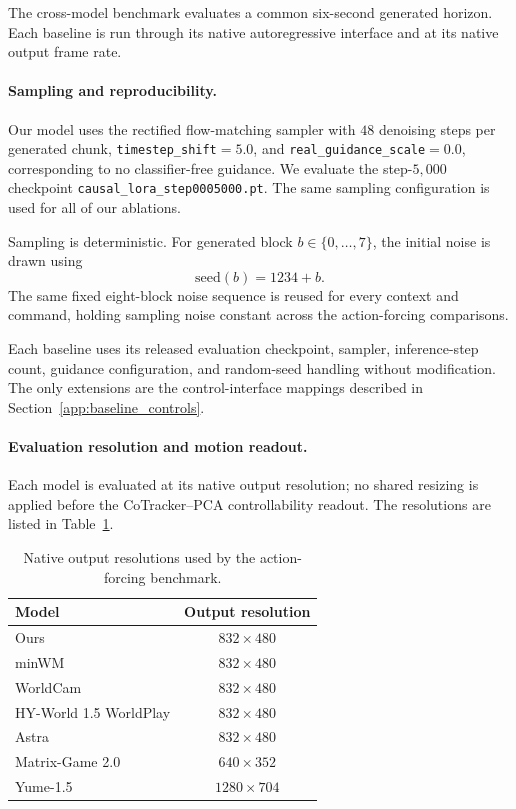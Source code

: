 The cross-model benchmark evaluates a common six-second generated horizon.
Each baseline is run through its native autoregressive interface and at its
native output frame rate.

\paragraph{Sampling and reproducibility.}
Our model uses the rectified flow-matching sampler with $48$ denoising steps
per generated chunk, \texttt{timestep\_shift}$=5.0$, and
\texttt{real\_guidance\_scale}$=0.0$, corresponding to no classifier-free
guidance. We evaluate the step-$5{,}000$ checkpoint
\texttt{causal\_lora\_step0005000.pt}. The same sampling configuration is used
for all of our ablations.

Sampling is deterministic. For generated block
$b\in\{0,\ldots,7\}$, the initial noise is drawn using
\[
\mathrm{seed}(b)=1234+b.
\]
The same fixed eight-block noise sequence is reused for every context and
command, holding sampling noise constant across the action-forcing
comparisons.

Each baseline uses its released evaluation checkpoint, sampler, inference-step
count, guidance configuration, and random-seed handling without modification.
The only extensions are the control-interface mappings described in
Section~\ref{app:baseline_controls}.

\paragraph{Evaluation resolution and motion readout.}
Each model is evaluated at its native output resolution; no shared resizing is
applied before the CoTracker--PCA controllability readout. The resolutions are
listed in Table~\ref{tab:action_forcing_resolutions}.

\begin{table}[t]
\centering
{
\small
\begin{tabular}{lc}
\toprule
Model & Output resolution \\
\midrule
Ours                   & $832\times480$  \\
minWM                  & $832\times480$  \\
WorldCam               & $832\times480$  \\
HY-World 1.5 WorldPlay & $832\times480$  \\
Astra                  & $832\times480$  \\
Matrix-Game 2.0        & $640\times352$  \\
Yume-1.5               & $1280\times704$ \\
\bottomrule
\end{tabular}
}
\caption{
    Native output resolutions used by the action-forcing benchmark.
}
\label{tab:action_forcing_resolutions}
\end{table}

